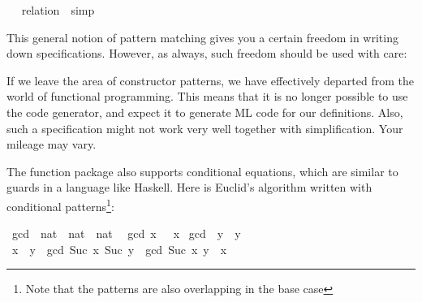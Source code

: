 \begin{isabellebody}
\isamarkupfalse%
%
\isadelimproof
\ %
\endisadelimproof
%
\isatagproof
{}\isamarkupfalse%
\ {}relation\ {}{}{}{}{}\ simp%
\endisatagproof
{\isafoldproof}%
%
\isadelimproof
%
\endisadelimproof
%
\begin{isamarkuptext}%
This general notion of pattern matching gives you a certain freedom
  in writing down specifications. However, as always, such freedom should
  be used with care:

  If we leave the area of constructor
  patterns, we have effectively departed from the world of functional
  programming. This means that it is no longer possible to use the
  code generator, and expect it to generate ML code for our
  definitions. Also, such a specification might not work very well together with
  simplification. Your mileage may vary.%
\end{isamarkuptext}%
\isamarkuptrue%
%
\isamarkuptrue%
%
\begin{isamarkuptext}%
The function package also supports conditional equations, which are
  similar to guards in a language like Haskell. Here is Euclid's
  algorithm written with conditional patterns\footnote{Note that the
  patterns are also overlapping in the base case}:%
\end{isamarkuptext}%
\isamarkuptrue%
\isamarkupfalse%
\ gcd\ {}{}\ {}nat\ {}\ nat\ {}\ nat{}\isanewline
{}\isanewline
\ \ {}gcd\ x\ {}\ {}\ x{}\isanewline
{}\ {}gcd\ {}\ y\ {}\ y{}\isanewline
{}\ {}x\ {}\ y\ {}\ gcd\ {}Suc\ x{}\ {}Suc\ y{}\ {}\ gcd\ {}Suc\ x{}\ {}y\ {}\ x{}{}\isanewline

\end{isabellebody}
